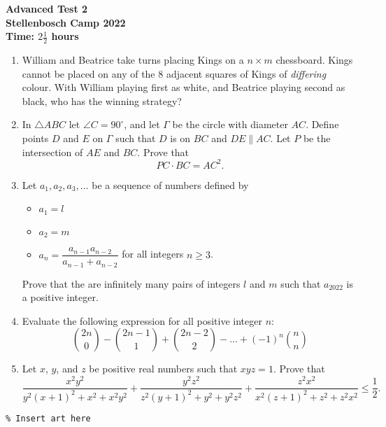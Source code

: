 \documentclass{article}
\begin{document}
\thispagestyle{empty}

\begin{center}
  \textbf{\Large Advanced Test 2}
  \\ \vspace{1em}
  \textbf{\large Stellenbosch Camp 2022}
  \\ \vspace{1em}
  \textbf{\large Time: $2\frac{1}{2}$ hours}
\end{center}

\bigskip

\vfill

\begin{enumerate}[itemsep=\fill]

\item %
William and Beatrice take turns placing Kings on a $n \times m$ chessboard.
Kings cannot be placed on any of the 8 adjacent squares of Kings of \emph{differing} colour.
With William playing first as white, and Beatrice playing second as black, who has the winning strategy?


\item %
In $\triangle ABC$ let $\angle C = 90^\circ$, and let $\Gamma$ be the circle with diameter $AC$.
Define points $D$ and $E$ on $\Gamma$ such that $D$ is on $BC$ and $DE \parallel AC$.
Let $P$ be the intersection of $AE$ and $BC$.
Prove that
\[ PC \cdot BC = AC^2. \]

\vspace{0pt}


\item %
Let $a_1, a_2, a_3, \dots$ be a sequence of numbers defined by 
\begin{itemize}
	\item $a_1 = l$
	\item $a_2 = m$
	\item $a_n = \dfrac{a_{n-1}a_{n-2}}{a_{n-1}+a_{n-2}}$ for all integers $n \geq 3$.
\end{itemize}
Prove that the are infinitely many pairs of integers $l$ and $m$ such that $a_{2022}$ is a positive integer.


\item %
Evaluate the following expression for all positive integer $n$:
\[ {2n \choose 0} -{2n-1 \choose 1}+{2n-2 \choose 2}-...+(-1)^n{n \choose n} \]

\vspace{0pt}


\item %
Let $x$, $y$, and $z$ be positive real numbers such that $xyz = 1$.
Prove that
\[ \frac{x^2y^2}{y^2(x+1)^2+x^2+x^2y^2} +\frac{y^2z^2}{z^2(y+1)^2+y^2+y^2z^2} +\frac{z^2x^2}{x^2(z+1)^2+z^2+z^2x^2} \leq \frac{1}{2}. \]

\end{enumerate}


\vfill
\centering
\small
\begin{BVerbatim}
\end{BVerbatim}
\end{document}
